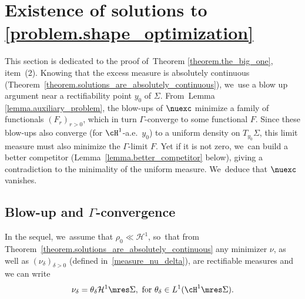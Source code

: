 \section{Existence of solutions to \texorpdfstring{\eqref{problem.shape_optimization}}{eqref}}\label{section.blowup}
This section is dedicated to the proof of~Theorem \ref{theorem.the_big_one}, item~(2). Knowing
that the excess measure is absolutely continuous (Theorem~\ref{theorem.solutions_are_absolutely_continuous}), we~use
a blow up argument near a rectifiability point $y_0$ of $\Sigma$.
From~Lemma \ref{lemma.auxiliary_problem}, the blow-ups of $\nuexc$ minimize a family of functionals $(F_r)_{r > 0}$, which in turn $\Gamma$-converge to some functional $F$.
Since these blow-ups also converge (for $\cH^1$-a.e.~$y_0$) to a uniform density on $T_{y_0}\Sigma$, this limit measure must also minimize the $\Gamma$-limit $F$.
Yet if it is not zero, we~can build a better competitor (Lemma~\ref{lemma.better_competitor} below), giving a contradiction to the minimality of the uniform measure. We~deduce that $\nuexc$ vanishes.

\subsection{Blow-up and $\Gamma$-convergence}\label{sec.gamma_convergence}
In the sequel, we~assume that $\rho_0 \ll \mathcal{H}^1$, so~that from Theorem~\ref{theorem.solutions_are_absolutely_continuous} any minimizer $\nu$, as well as ${(\nu_\delta)}_{\delta > 0}$ (defined in~\eqref{measure_nu_delta}), are rectifiable measures and we can write
\[
\nu_\delta = \theta_\delta \mathcal{H}^1\mres \Sigma,
\text{ for }
\theta_\delta \in L^1(\cH^1\mres \Sigma).
\]

